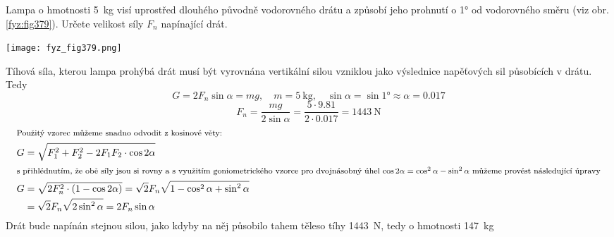 \begin{example}\label{fyz:fey_exam011}
  Lampa o hmotnosti \SI{5}{\kg} visí uprostřed dlouhého původně vodorovného drátu a způsobí jeho 
  prohnutí o \ang{1} od vodorovného směru (viz obr. \ref{fyz:fig379}). Určete velikost síly \(F_n\)
  napínající drát. 
      
  {\centering
   \captionsetup{type=figure}
   \texttt{[image: fyz\_fig379.png]}
  \par}
  
  Tíhová síla, kterou lampa prohýbá drát musí být vyrovnána vertikální silou vzniklou jako 
  výslednice napěťových sil působících v drátu. Tedy
  \begin{equation*}
     G = 2F_n\sin\alpha = mg, \quad m = \SI{5}{\kg}, \quad
     \sin\alpha = \sin\ang{1} \approx \alpha = \num{0.017}
  \end{equation*}
  \begin{equation*}
    F_n = \frac{mg}{2\sin\alpha} = \frac{\num{5}\cdot\num{9.81}}{2\cdot\num{0.017}}
        = \SI{1443}{\newton}
  \end{equation*}
  \begingroup\makeatletter\def\f@size{7}\check@mathfonts
  \def\maketag@@@#1{\hbox{\m@th\large\normalfont#1}}%
    \begin{align*}
      \shortintertext{\footnotesize Použitý vzorec můžeme snadno odvodit z kosinové věty:}
      G &= \sqrt{F_1^2 + F_2^2 - 2F_1F_2\cdot\cos2\alpha} \\
      \shortintertext{\footnotesize s přihlédnutím, že obě síly jsou si rovny a s využitím  
        goniometrického vzorce pro dvojnásobný úhel \(\cos2\alpha = \cos^2\alpha - \sin^2\alpha\) 
        můžeme provést následující úpravy} 
      G &= \sqrt{2F_n^2\cdot(1-\cos2\alpha)}=\sqrt{2}F_n\sqrt{1-\cos^2\alpha+\sin^2\alpha}  \\
        &=\sqrt{2}F_n\sqrt{2\sin^2\alpha} = 2F_n\sin\alpha
    \end{align*}
  \endgroup
  Drát bude napínán stejnou silou, jako kdyby na něj působilo tahem těleso tíhy \SI{1443}{\newton}, 
  tedy o hmotnosti \SI{147}{\kg}
\end{example}